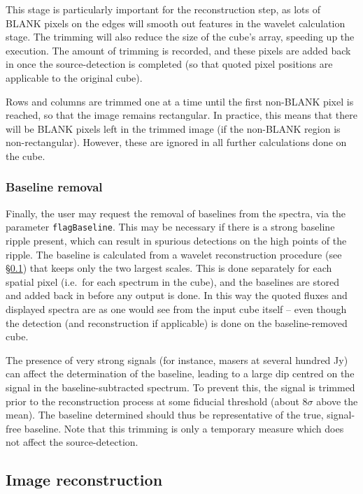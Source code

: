 \documentclass[12pt,a4paper]{article}
\newcommand{\ie}{i.e.\ }
\begin{document}
This stage is particularly important for the reconstruction step, as
lots of BLANK pixels on the edges will smooth out features in the
wavelet calculation stage. The trimming will also reduce the size of
the cube's array, speeding up the execution. The amount of trimming is
recorded, and these pixels are added back in once the source-detection
is completed (so that quoted pixel positions are applicable to the
original cube).

Rows and columns are trimmed one at a time until the first non-BLANK
pixel is reached, so that the image remains rectangular. In practice,
this means that there will be BLANK pixels left in the trimmed image
(if the non-BLANK region is non-rectangular). However, these are
ignored in all further calculations done on the cube.

\subsubsection{Baseline removal}

Finally, the user may request the removal of baselines from the
spectra, via the parameter {\tt flagBaseline}. This may be necessary
if there is a strong baseline ripple present, which can result in
spurious detections on the high points of the ripple. The baseline is
calculated from a wavelet reconstruction procedure (see
\S\ref{sec-recon}) that keeps only the two largest scales. This is
done separately for each spatial pixel (\ie for each spectrum in the
cube), and the baselines are stored and added back in before any
output is done. In this way the quoted fluxes and displayed spectra
are as one would see from the input cube itself -- even though the
detection (and reconstruction if applicable) is done on the
baseline-removed cube.

The presence of very strong signals (for instance, masers at several
hundred Jy) can affect the determination of the baseline, leading to a
large dip centred on the signal in the baseline-subtracted
spectrum. To prevent this, the signal is trimmed prior to the
reconstruction process at some fiducial threshold (about $8\sigma$
above the mean). The baseline determined should thus be representative
of the true, signal-free baseline. Note that this trimming is only a
temporary measure which does not affect the source-detection.

\subsection{Image reconstruction}
\label{sec-recon}
\end{document}
